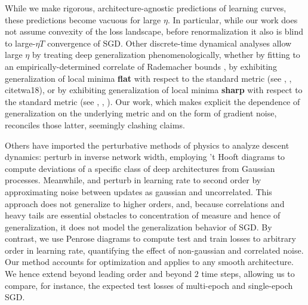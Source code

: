 \documentclass{article}
\begin{document}

    While we make rigorous, architecture-agnostic predictions of learning
    curves, these predictions become vacuous for large $\eta$.  In particular,
    while our work does not assume convexity of the loss landscape, before
    renormalization it also is blind to large-$\eta T$ convergence of SGD.
    Other discrete-time dynamical analyses allow large $\eta$ by treating deep
    generalization phenomenologically, whether by fitting to an
    empirically-determined correlate of Rademacher bounds \citep{li18}, by
    exhibiting generalization of local minima {\bf flat} with respect to the
    standard metric (see \citet{ho17}, \citet{ke17}, citet{wa18}), or by
    exhibiting generalization of local minima {\bf sharp} with respect to the
    standard metric (see \citet{st56}, \citet{di17}, \citet{wu18}).  Our work,
    which makes explicit the dependence of generalization on the underlying
    metric and on the form of gradient noise, reconciles those latter,
    seemingly clashing claims.
    

    Others have imported the perturbative methods of physics to analyze descent
    dynamics:  \citet{dy19} perturb in inverse network width, employing 't
    Hooft diagrams to compute deviations of a specific class of deep
    architectures from Gaussian processes.  Meanwhile, \cite{ch18} and
    \citet{li17} perturb in learning rate to second order by approximating
    noise between updates as gaussian and uncorrelated.  This approach does not
    generalize to higher orders, and, because correlations and heavy tails are
    essential obstacles to concentration of measure and hence of
    generalization, it does not model the generalization behavior of SGD.  By
    contrast, we use Penrose diagrams to compute test and train losses to
    arbitrary order in learning rate, quantifying the effect of non-gaussian
    and correlated noise.  Our method accounts for optimization and applies to
    any smooth architecture.  We hence extend \citet{ro18} beyond leading order
    and beyond $2$ time steps, allowing us to compare, for instance, the
    expected test losses of multi-epoch and single-epoch SGD.
\end{document}
